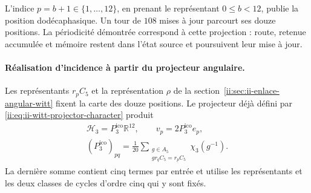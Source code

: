 L’indice \(p=b+1\in\{1,\ldots,12\}\), en prenant le représentant
\(0\le b<12\), publie la position dodécaphasique. Un tour de
\(108\) mises à jour parcourt ses douze positions. La périodicité
démontrée correspond à cette projection : route, retenue accumulée et
mémoire restent dans l’état source et poursuivent leur mise à jour.

\paragraph{Réalisation d’incidence à partir du projecteur angulaire.}
Les représentants \(r_pC_5\) et la représentation \(\rho\) de la
section~\ref{ii:sec:ii-enlace-angular-witt} fixent la carte des douze
positions. Le projecteur déjà défini par
\eqref{ii:eq:ii-witt-projector-character} produit
\begin{equation}
 \begin{gathered}
 \mathcal H_3=P_3^{\mathrm{ico}}\mathbb R^{12},\qquad v_p=2P_3^{\mathrm{ico}}e_p,
 \\[-2pt]
 (P_3^{\mathrm{ico}})_{pq}=\frac1{20}
 \sum_{\substack{g\in A_5\\gr_qC_5=r_pC_5}}\chi_3(g^{-1}).
 \end{gathered}
 \label{ii:ii:dodeca:vertices-proyector}
\end{equation}
La dernière somme contient cinq termes par entrée et utilise les
représentants et les deux classes de cycles d’ordre cinq qui y sont fixés.

